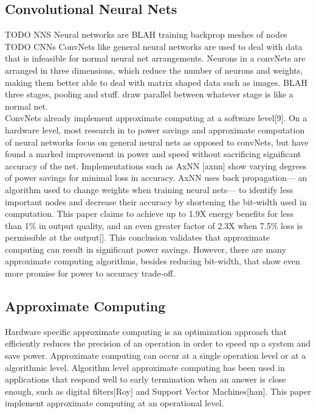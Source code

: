 \documentclass[conference]{IEEEtran}
\begin{document}
\subsection{Convolutional Neural Nets}
TODO NNS
	\indent Neural networks are BLAH training backprop meshes of nodes\\
	
TODO CNNs
	\indent ConvNets like general neural networks are used to deal with data that is infeasible for normal neural net arrangements. Neurons in a convNets are arranged in three dimensions, which reduce the number of neurons and weights, making them better able to deal with matrix shaped data such as images. BLAH three stages, pooling and stuff. draw parallel between whatever stage is like a normal net.  \\
	
	\indent ConvNets already implement approximate computing at a software level[9]. On a hardware level, most research in to power savings and approximate computation of neural networks focus on general neural nets as opposed to convNets, but have found a marked improvement in power and speed without sacrificing significant accuracy of the net. Implementations such as AxNN [axnn] show varying degrees of power savings for minimal loss in accuracy. AxNN uses back propagation--- an algorithm used to change weights when training neural nets--- to identify less important nodes and decrease their accuracy by shortening the bit-width used in computation. This paper claims to achieve up to 1.9X energy benefits for less than 1\% in output quality, and an even greater factor of 2.3X when 7.5\% loss is permissible at the output[]. This conclusion validates that approximate computing can result in significant power savings. However, there are many approximate computing algorithms, besides reducing bit-width, that show even more promise for power to accuracy trade-off.

\subsection{Approximate Computing}

	\indent Hardware specific approximate computing is an optimization approach that efficiently reduces the precision of an operation in order to speed up a system and save power. Approximate computing can occur at a single operation level or at a algorithmic level. Algorithm level approximate computing has been used in applications that respond well to early termination when an answer is close enough, such as digital filters[Roy] and Support Vector Machines[han]. This paper implement approximate computing at an operational level.\\
	
\end{document}
